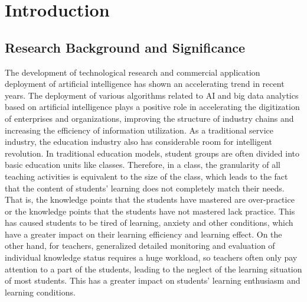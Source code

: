 
\chapter{Introduction}  %

\ifpdf
	\graphicspath{{Chapter1/Figs/Raster/}{Chapter1/Figs/PDF/}{Chapter1/Figs/}}
\else
	\graphicspath{{Chapter1/Figs/Vector/}{Chapter1/Figs/}}
\fi


\section{Research Background and Significance} %

The development of technological research and commercial application deployment of artificial intelligence has shown an accelerating trend in recent years. The deployment of various algorithms related to AI and big data analytics based on artificial intelligence plays a positive role in accelerating the digitization of enterprises and organizations, improving the structure of industry chains and increasing the efficiency of information utilization. As a traditional service industry, the education industry also has considerable room for intelligent revolution. In traditional education models, student groups are often divided into basic education units like classes. Therefore, in a class, the granularity of all teaching activities is equivalent to the size of the class, which leads to the fact that the content of students' learning does not completely match their needs. That is, the knowledge points that the students have mastered are over-practice or the knowledge points that the students have not mastered lack practice. This has caused students to be tired of learning, anxiety and other conditions, which have a greater impact on their learning efficiency and learning effect. On the other hand, for teachers, generalized detailed monitoring and evaluation of individual knowledge status requires a huge workload, so teachers often only pay attention to a part of the students, leading to the neglect of the learning situation of most students. This has a greater impact on students' learning enthusiasm and learning conditions.

